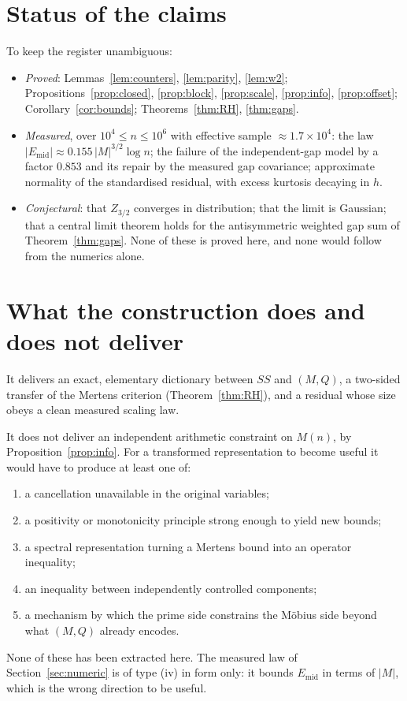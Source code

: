 \documentclass[11pt]{amsart}
\theoremstyle{definition}
\newcommand{\Mert}{M}
\newcommand{\Sq}{Q}
\begin{document}
\section{Status of the claims}

To keep the register unambiguous:
\begin{itemize}[leftmargin=1.6em]
\item \emph{Proved}: Lemmas~\ref{lem:counters}, \ref{lem:parity}, \ref{lem:w2};
Propositions~\ref{prop:closed}, \ref{prop:block}, \ref{prop:scale},
\ref{prop:info}, \ref{prop:offset}; Corollary~\ref{cor:bounds};
Theorems~\ref{thm:RH}, \ref{thm:gaps}.
\item \emph{Measured}, over $10^{4}\le n\le10^{6}$ with effective sample
$\approx1.7\times10^{4}$: the law
$|E_{\mathrm{mid}}|\approx0.155\,|\Mert|^{3/2}\log n$; the failure of the
independent-gap model by a factor $0.853$ and its repair by the measured gap
covariance; approximate normality of the standardised residual, with excess
kurtosis decaying in $h$.
\item \emph{Conjectural}: that $Z_{3/2}$ converges in distribution; that the
limit is Gaussian; that a central limit theorem holds for the antisymmetric
weighted gap sum of Theorem~\ref{thm:gaps}. None of these is proved here, and
none would follow from the numerics alone.
\end{itemize}

\section{What the construction does and does not deliver}

It delivers an exact, elementary dictionary between $SS$ and $(\Mert,\Sq)$, a
two-sided transfer of the Mertens criterion (Theorem~\ref{thm:RH}), and a
residual whose size obeys a clean measured scaling law.

It does not deliver an independent arithmetic constraint on $\Mert(n)$, by
Proposition~\ref{prop:info}. For a transformed representation to become useful
it would have to produce at least one of:
\begin{enumerate}[label=(\roman*)]
\item a cancellation unavailable in the original variables;
\item a positivity or monotonicity principle strong enough to yield new bounds;
\item a spectral representation turning a Mertens bound into an operator inequality;
\item an inequality between independently controlled components;
\item a mechanism by which the prime side constrains the M\"obius side beyond
what $(\Mert,\Sq)$ already encodes.
\end{enumerate}
None of these has been extracted here. The measured law of
Section~\ref{sec:numeric} is of type (iv) in form only: it bounds
$E_{\mathrm{mid}}$ in terms of $|\Mert|$, which is the wrong direction to be
useful.
\end{document}

